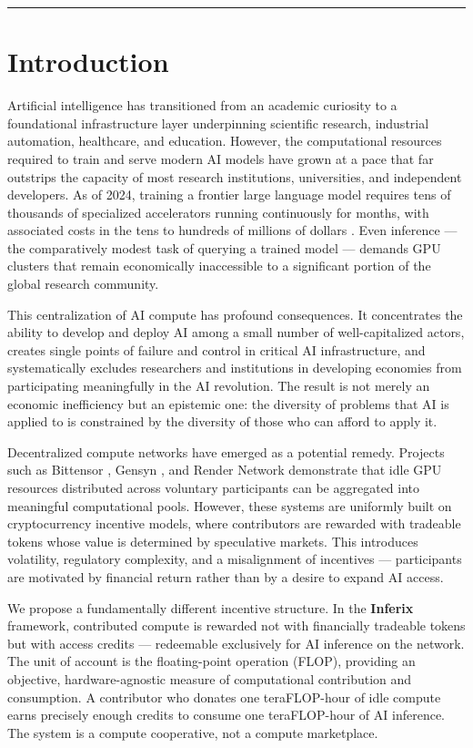 \documentclass[12pt]{article}
\begin{document}
\vspace{1em}
\hrule

\section{Introduction}

Artificial intelligence has transitioned from an academic curiosity to a foundational infrastructure layer underpinning scientific research, industrial automation, healthcare, and education. However, the computational resources required to train and serve modern AI models have grown at a pace that far outstrips the capacity of most research institutions, universities, and independent developers. As of 2024, training a frontier large language model requires tens of thousands of specialized accelerators running continuously for months, with associated costs in the tens to hundreds of millions of dollars \cite{openai2023gpt4}. Even inference — the comparatively modest task of querying a trained model — demands GPU clusters that remain economically inaccessible to a significant portion of the global research community.

This centralization of AI compute has profound consequences. It concentrates the ability to develop and deploy AI among a small number of well-capitalized actors, creates single points of failure and control in critical AI infrastructure, and systematically excludes researchers and institutions in developing economies from participating meaningfully in the AI revolution. The result is not merely an economic inefficiency but an epistemic one: the diversity of problems that AI is applied to is constrained by the diversity of those who can afford to apply it.

Decentralized compute networks have emerged as a potential remedy. Projects such as Bittensor \cite{bittensor2022}, Gensyn \cite{gensyn2022}, and Render Network \cite{rendernetwork2020} demonstrate that idle GPU resources distributed across voluntary participants can be aggregated into meaningful computational pools. However, these systems are uniformly built on cryptocurrency incentive models, where contributors are rewarded with tradeable tokens whose value is determined by speculative markets. This introduces volatility, regulatory complexity, and a misalignment of incentives — participants are motivated by financial return rather than by a desire to expand AI access.

We propose a fundamentally different incentive structure. In the \textbf{Inferix} framework, contributed compute is rewarded not with financially tradeable tokens but with access credits — redeemable exclusively for AI inference on the network. The unit of account is the floating-point operation (FLOP), providing an objective, hardware-agnostic measure of computational contribution and consumption. A contributor who donates one teraFLOP-hour of idle compute earns precisely enough credits to consume one teraFLOP-hour of AI inference. The system is a compute cooperative, not a compute marketplace.
\end{document}
